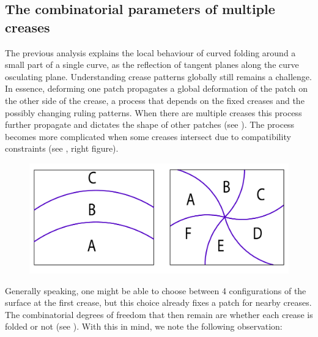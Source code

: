 

\subsection{The combinatorial parameters of multiple creases}
The previous analysis explains the local behaviour of curved folding around a small part of a single curve, as the reflection of tangent planes along the curve osculating plane. Understanding crease patterns globally still remains a challenge. In essence, deforming one patch propagates a global deformation of the patch on the other side of the crease, a process that depends on the fixed creases and the possibly changing ruling patterns. When there are multiple creases this process further propagate and dictates the shape of other patches (see ). The process becomes more complicated when some creases intersect due to compatibility constraints (see , right figure). 

\begin{figure} [h]
	\centering
	\includegraphics[width=0.7\linewidth]{figures/multiple_crease_patterns}
	\caption{}
	\label{fig:multiple_crease_pattern}
\end{figure}

Generally speaking, one might be able to choose between 4 configurations of the surface at the first crease, but this choice already fixes a patch for nearby creases. The combinatorial degrees of freedom that then remain are whether each crease is folded or not (see  ). With this in mind, we note the following observation:

